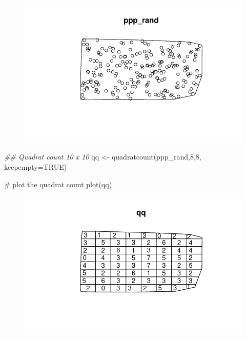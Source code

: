\documentclass[
  letterpaper,
  DIV=11,
  numbers=noendperiod]{scrreprt}
\newenvironment{Shaded}{\begin{snugshade}}{\end{snugshade}}
\newcommand{\AttributeTok}[1]{\textcolor[rgb]{0.40,0.45,0.13}{#1}}
\newcommand{\CommentTok}[1]{\textcolor[rgb]{0.37,0.37,0.37}{#1}}
\newcommand{\ConstantTok}[1]{\textcolor[rgb]{0.56,0.35,0.01}{#1}}
\newcommand{\DecValTok}[1]{\textcolor[rgb]{0.68,0.00,0.00}{#1}}
\newcommand{\DocumentationTok}[1]{\textcolor[rgb]{0.37,0.37,0.37}{\textit{#1}}}
\newcommand{\FunctionTok}[1]{\textcolor[rgb]{0.28,0.35,0.67}{#1}}
\newcommand{\NormalTok}[1]{\textcolor[rgb]{0.00,0.23,0.31}{#1}}
\newcommand{\OtherTok}[1]{\textcolor[rgb]{0.00,0.23,0.31}{#1}}
\begin{document}
\begin{figure}[H]

{\centering \includegraphics{spatial-tests_files/figure-pdf/unnamed-chunk-34-1.pdf}

}

\end{figure}

\begin{Shaded}
\begin{Highlighting}[]
\DocumentationTok{\#\# Quadrat count 10 x 10}
\NormalTok{qq }\OtherTok{\textless{}{-}} \FunctionTok{quadratcount}\NormalTok{(ppp\_rand,}\DecValTok{8}\NormalTok{,}\DecValTok{8}\NormalTok{, }\AttributeTok{keepempty=}\ConstantTok{TRUE}\NormalTok{) }

\CommentTok{\# plot the quadrat count}
\FunctionTok{plot}\NormalTok{(qq)}
\end{Highlighting}
\end{Shaded}

\begin{figure}[H]

{\centering \includegraphics{spatial-tests_files/figure-pdf/unnamed-chunk-34-2.pdf}

}

\end{figure}
\end{document}
